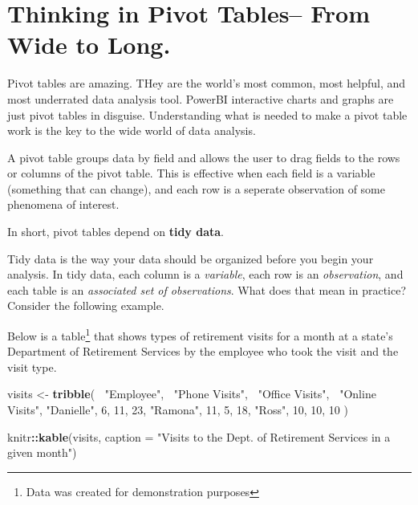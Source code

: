 \documentclass[]{book}
\newenvironment{Shaded}{\begin{snugshade}}{\end{snugshade}}
\newcommand{\DataTypeTok}[1]{\textcolor[rgb]{0.13,0.29,0.53}{#1}}
\newcommand{\DecValTok}[1]{\textcolor[rgb]{0.00,0.00,0.81}{#1}}
\newcommand{\KeywordTok}[1]{\textcolor[rgb]{0.13,0.29,0.53}{\textbf{#1}}}
\newcommand{\NormalTok}[1]{#1}
\newcommand{\OperatorTok}[1]{\textcolor[rgb]{0.81,0.36,0.00}{\textbf{#1}}}
\newcommand{\StringTok}[1]{\textcolor[rgb]{0.31,0.60,0.02}{#1}}
\begin{document}
\hypertarget{thinking-in-pivot-tables-from-wide-to-long.}{%
\section{Thinking in Pivot Tables-- From Wide to Long.}\label{thinking-in-pivot-tables-from-wide-to-long.}}

Pivot tables are amazing. THey are the world's most common, most helpful, and most underrated data analysis tool. PowerBI interactive charts and graphs are just pivot tables in disguise. Understanding what is needed to make a pivot table work is the key to the wide world of data analysis.

A pivot table groups data by field and allows the user to drag fields to the rows or columns of the pivot table. This is effective when each field is a variable (something that can change), and each row is a seperate observation of some phenomena of interest.

In short, pivot tables depend on \textbf{tidy data}.

Tidy data is the way your data should be organized before you begin your analysis. In tidy data, each column is a \emph{variable}, each row is an \emph{observation}, and each table is an \emph{associated set of observations}. What does that mean in practice? Consider the following example.

Below is a table\footnote{Data was created for demonstration purposes} that shows types of retirement visits for a month at a state's Department of Retirement Services by the employee who took the visit and the visit type.

\begin{Shaded}
\begin{Highlighting}[]
\NormalTok{visits <-}\StringTok{ }\KeywordTok{tribble}\NormalTok{(}
  \OperatorTok{~}\StringTok{"Employee"}\NormalTok{, }\OperatorTok{~}\StringTok{"Phone Visits"}\NormalTok{, }\OperatorTok{~}\StringTok{"Office Visits"}\NormalTok{, }\OperatorTok{~}\StringTok{"Online Visits"}\NormalTok{,}
  \StringTok{"Danielle"}\NormalTok{, }\DecValTok{6}\NormalTok{, }\DecValTok{11}\NormalTok{, }\DecValTok{23}\NormalTok{,}
  \StringTok{"Ramona"}\NormalTok{, }\DecValTok{11}\NormalTok{, }\DecValTok{5}\NormalTok{, }\DecValTok{18}\NormalTok{,}
  \StringTok{"Ross"}\NormalTok{, }\DecValTok{10}\NormalTok{, }\DecValTok{10}\NormalTok{, }\DecValTok{10} 
\NormalTok{)}

\NormalTok{knitr}\OperatorTok{::}\KeywordTok{kable}\NormalTok{(visits, }\DataTypeTok{caption =} \StringTok{"Visits to the Dept. of Retirement Services in a given month"}\NormalTok{)}
\end{Highlighting}
\end{Shaded}
\end{document}
